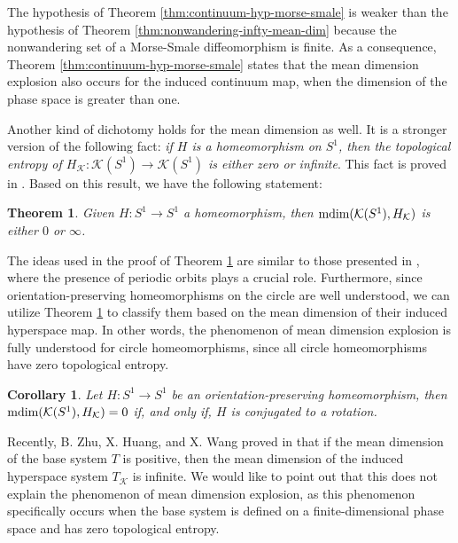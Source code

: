 \documentclass[sn-mathphys-num]{sn-jnl}%
\theoremstyle{thmstyleone}%
\newtheorem{theorem}{Theorem}%
\newtheorem{corollary}{Corollary}
\theoremstyle{thmstyletwo}%
\theoremstyle{thmstylethree}%
\newcommand*\induce[1]{#1_\mathcal{K}}
\newcommand*\hyp[1]{\mathcal{#1}}
\begin{document}
The hypothesis of Theorem \ref{thm:continuum-hyp-morse-smale} is weaker than the hypothesis of Theorem \ref{thm:nonwandering-infty-mean-dim} because the nonwandering set of a Morse-Smale diffeomorphism is finite. As a consequence, Theorem \ref{thm:continuum-hyp-morse-smale} states that the mean dimension explosion also occurs for the induced continuum map, when the dimension of the phase space is greater than one.

Another kind of dichotomy holds for the mean dimension as well. It is a stronger version of the following fact: \textit{if $H$ is a homeomorphism on $S^1$, then the topological entropy of $\induce{H}: \hyp{K}(S^1) \to \hyp{K}(S^1)$ is either zero or infinite}. This fact is proved in \cite[Theorem 5]{lampart_raith_2010}. Based on this result, we have the following statement:\\

\begin{theorem}\label{thm:dichotomy-circle-homeo}
    Given $H: S^1 \to S^1$ a homeomorphism, then $\normalfont{\text{mdim}}(\hyp{K}(S^1), \induce{H})$ is either $0$ or $\infty$.\\
\end{theorem}

The ideas used in the proof of Theorem \ref{thm:dichotomy-circle-homeo} are similar to those presented in \cite{lampart_raith_2010}, where the presence of periodic orbits plays a crucial role. Furthermore, since orientation-preserving homeomorphisms on the circle are well understood, we can utilize Theorem \ref{thm:dichotomy-circle-homeo} to classify them based on the mean dimension of their induced hyperspace map. In other words, the phenomenon of mean dimension explosion is fully understood for circle homeomorphisms, since all circle homeomorphisms have zero topological entropy. \\

\begin{corollary}\label{coro:rotation-number-mean-dimension}
    Let $H: S^1 \to S^1$ be an orientation-preserving homeomorphism, then $\normalfont{\text{mdim}}(\hyp{K}(S^1), \induce{H}) = 0$ if, and only if, $H$ is conjugated to a rotation.\\
\end{corollary}

Recently, B. Zhu, X. Huang, and X. Wang proved in \cite{zhu_huang_wang_2024} that if the mean dimension of the base system $T$ is positive, then the mean dimension of the induced hyperspace system $\induce{T}$ is infinite. We would like to point out that this does not explain the phenomenon of mean dimension explosion, as this phenomenon specifically occurs when the base system is defined on a finite-dimensional phase space and has zero topological entropy.
\end{document}
